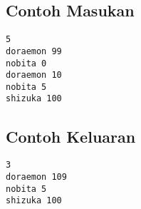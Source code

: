 \documentclass{article}
\begin{document}
\begin{multicols}{2}
\subsection*{Contoh Masukan}
\begin{lstlisting}
5
doraemon 99
nobita 0
doraemon 10
nobita 5
shizuka 100

\end{lstlisting}
\columnbreak
\subsection*{Contoh Keluaran}
\begin{lstlisting}
3
doraemon 109
nobita 5
shizuka 100

\end{lstlisting}
\vfill
\null
\end{multicols}
\end{document}
